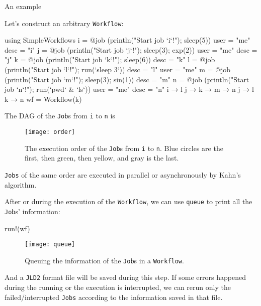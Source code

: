 \begin{frame}{An example}

    Let's construct an arbitrary \texttt{Workflow}:
    {\scriptsize
    \begin{algorithmblock}
        \begin{juliaverbatim}
            using SimpleWorkflows
            i = @job (println("Start job `i`!"); sleep(5)) user = "me" desc = "i"
            j = @job (println("Start job `j`!"); sleep(3); exp(2)) user = "me" desc = "j"
            k = @job (println("Start job `k`!"); sleep(6)) desc = "k"
            l = @job (println("Start job `l`!"); run(`sleep 3`)) desc = "l" user = "me"
            m = @job (println("Start job `m`!"); sleep(3); sin(1)) desc = "m"
            n = @job (println("Start job `n`!"); run(`pwd` & `ls`)) user = "me" desc = "n"
            i → l
            j → k → m → n
            j → l
            k → n
            wf = Workflow(k)
        \end{juliaverbatim}
    \end{algorithmblock}
    }

    \framebreak

    The DAG of the \texttt{Job}s from \texttt{i} to \texttt{n} is

    \begin{figure}[H]
        \centering
        \texttt{[image: order]}
        \caption{The execution order of the \texttt{Job}s from \texttt{i} to \texttt{n}.
            Blue circles are the first, then green, then yellow, and gray is the last.}
        \label{fig:order}
    \end{figure}

    \texttt{Jobs} of the same order are executed in parallel or asynchronously by
    Kahn's algorithm.

    \framebreak

    After or during the execution of the \texttt{Workflow}, we can use \texttt{queue} to
    print all the \texttt{Job}s' information:

    {\scriptsize
    \begin{algorithmblock}
        \begin{juliaverbatim}
            run!(wf)
        \end{juliaverbatim}
    \end{algorithmblock}
    }

    \begin{figure}[H]
        \centering
        \texttt{[image: queue]}
        \caption{Queuing the information of the \texttt{Job}s in a \texttt{Workflow}.}
        \label{fig:queue}
    \end{figure}

    And a \texttt{JLD2} format file will be saved during this step. If some errors happened
    during the running or the execution is interrupted, we can rerun only the
    failed/interrupted \texttt{Jobs} according to the information saved in that file.

\end{frame}
